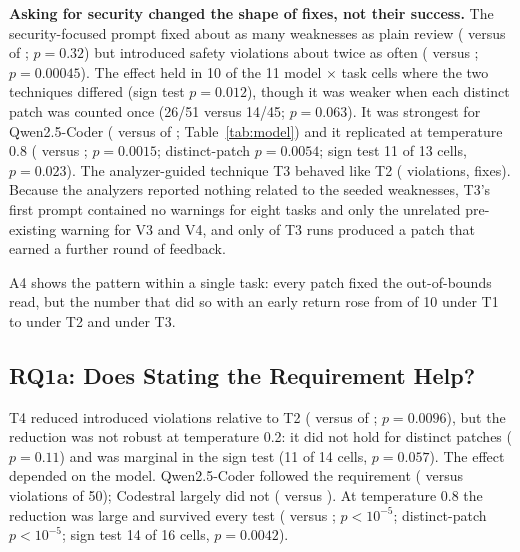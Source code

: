 \documentclass[12pt]{IEEEtran}
\begin{document}
\textbf{Asking for security changed the shape of fixes, not their success.} The security-focused prompt fixed about as many weaknesses as plain review ( versus  of ; $p = 0.32$) but introduced safety violations about twice as often ( versus ; $p = 0.00045$). The effect held in 10 of the 11 model $\times$ task cells where the two techniques differed (sign test $p = 0.012$), though it was weaker when each distinct patch was counted once (26/51 versus 14/45; $p = 0.063$). It was strongest for Qwen2.5-Coder ( versus  of ; Table~\ref{tab:model}) and it replicated at temperature 0.8 ( versus ; $p = 0.0015$; distinct-patch $p = 0.0054$; sign test 11 of 13 cells, $p = 0.023$). The analyzer-guided technique T3 behaved like T2 ( violations,  fixes). Because the analyzers reported nothing related to the seeded weaknesses, T3's first prompt contained no warnings for eight tasks and only the unrelated pre-existing warning for V3 and V4, and only  of  T3 runs produced a patch that earned a further round of feedback.



A4 shows the pattern within a single task: every patch fixed the out-of-bounds read, but the number that did so with an early return rose from  of 10 under T1 to  under T2 and  under T3.

\subsection{RQ1a: Does Stating the Requirement Help?}
T4 reduced introduced violations relative to T2 ( versus  of ; $p = 0.0096$), but the reduction was not robust at temperature 0.2: it did not hold for distinct patches ($p = 0.11$) and was marginal in the sign test (11 of 14 cells, $p = 0.057$). The effect depended on the model. Qwen2.5-Coder followed the requirement ( versus  violations of 50); Codestral largely did not ( versus ). At temperature 0.8 the reduction was large and survived every test ( versus ; $p < 10^{-5}$; distinct-patch $p < 10^{-5}$; sign test 14 of 16 cells, $p = 0.0042$).
\end{document}
